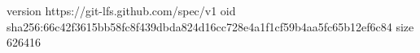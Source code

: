 version https://git-lfs.github.com/spec/v1
oid sha256:66c42f3615bb58fc8f439dbda824d16cc728e4a1f1cf59b4aa5fc65b12ef6c84
size 626416

